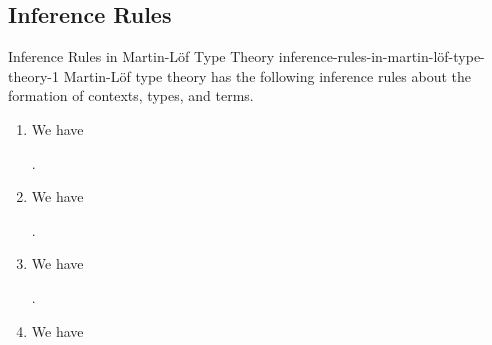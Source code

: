 \subsection{Inference Rules}\label{subsection-martin-löf-type-theory-inference-rules}
\begin{definition}{Inference Rules in Martin-Löf Type Theory \rmI}{inference-rules-in-martin-löf-type-theory-1}%
    Martin-Löf type theory has the following inference rules about the formation of contexts, types, and terms.
    \begin{enumerate}
        \item\label{inference-rules-in-martin-löf-type-theory-1-formation-of-dependent-types}We have
            \begin{webprooftree}%
                \begin{prooftree}%
                \end{prooftree}%
                .%
            \end{webprooftree}%
        \item\label{inference-rules-in-martin-löf-type-theory-1-formation-of-judgemental-equality-of-types-1}We have
            \begin{webprooftree}%
                \begin{prooftree}%
                \end{prooftree}%
                .%
            \end{webprooftree}%
        \item\label{inference-rules-in-martin-löf-type-theory-1-formation-of-judgemental-equality-of-types-1}We have
            \begin{webprooftree}%
                \begin{prooftree}%
                \end{prooftree}%
                .%
            \end{webprooftree}%
        \item\label{inference-rules-in-martin-löf-type-theory-1-formation-of-terms}We have

\end{enumerate}
\end{definition}
